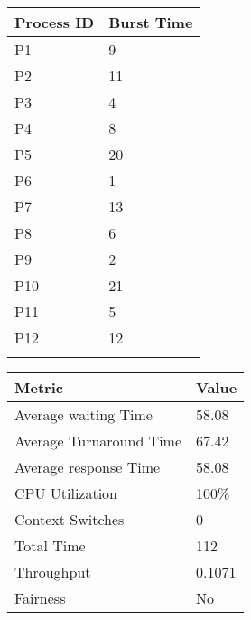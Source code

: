 \documentclass{article}
\begin{document}
\begin{minipage}[t]{0.3\textwidth}
    \begin{tabularx}{\textwidth}{|l|X|}
    \hline
    \rowcolor{darkblue}
    \textbf{Process ID} & \textbf{Burst Time}\\
    \hline
    \rowcolor{lightblue}
    P1 & 9 \\
    P2 & 11 \\
    \rowcolor{lightblue}
    P3 & 4 \\
    P4 & 8 \\
    \rowcolor{lightblue}
    P5 & 20 \\
    P6 & 1 \\
    \rowcolor{lightblue}
    P7 & 13 \\
    P8 & 6 \\
    \rowcolor{lightblue}
    P9 & 2 \\
    P10 & 21 \\
    \rowcolor{lightblue}
    P11 & 5 \\
    P12 & 12 \\
    \rowcolor{lightblue}
    \hline
    \end{tabularx}
\end{minipage}
\hspace{2cm}
\begin{minipage}[t!]{0.35\textwidth}
    \begin{tabularx}{\textwidth}{|l|X|}
    \hline
    \rowcolor{darkblue}
    \textbf{Metric} & \textbf{Value} \\
    \hline
    \rowcolor{lightblue}
    Average waiting Time & 58.08 \\
    Average Turnaround Time & 67.42 \\
    \rowcolor{lightblue}
    Average response Time & 58.08 \\
    CPU Utilization & 100\% \\
    \rowcolor{lightblue}
    Context Switches & 0 \\
    Total Time & 112 \\
    \rowcolor{lightblue}
    Throughput & 0.1071 \\
    Fairness & No \\
    \hline
    \end{tabularx}
\end{minipage}

\bigskip
\end{document}
